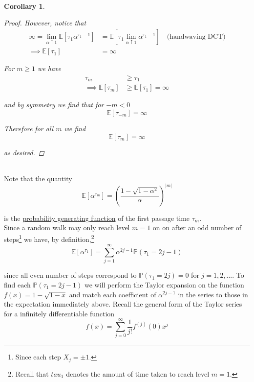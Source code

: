 \documentclass[12pt]{article}
\newtheorem{corollary}{Corollary}
\newlength\tindent
\renewcommand{\indent}{\hspace*{\tindent}}
\renewcommand{\P}{\mathbb P}
\newcommand{\E}{\mathbb E}
\begin{document}
\begin{corollary}
\begin{proof}
However, notice that
\begin{align*}
	\infty = \lim_{\alpha\uparrow 1} \E[\tau_1 \alpha^{\tau_1 - 1} ] &= \E \left[ \tau_1 \lim_{\alpha\uparrow 1} \alpha^{\tau_1 - 1} \right] \quad \text{(handwaving DCT)} \\
	\implies \E[\tau_1] &= \infty
\end{align*}

For $m \geq 1$ we have
\begin{align*}
	\tau_m &\geq \tau_1 \\
	\implies \E[\tau_m] &\geq \E[\tau_1] = \infty
\end{align*}

and by symmetry we find that for $-m < 0$
\begin{equation*}
	\E[\tau_{-m}] = \infty
\end{equation*}

Therefore for all $m$ we find
\begin{equation*}
	\E[\tau_m] = \infty
\end{equation*}

as desired.
\end{proof}
\end{corollary} \hfill\\

Note that the quantity
\begin{equation*}
	\E[\alpha^{\tau_m}] = \left(  \frac{ 1 - \sqrt{1 - \alpha^2} }{ \alpha } \right)^{|m|} 
\end{equation*}

is the \underline{probability generating function} of the first passage time $\tau_m$. \\

\indent Since a random walk may only reach level $m = 1$ on on after an odd number of steps\footnote{Since each step $X_j = \pm 1$.} we have, by definition,\footnote{Recall that $tau_1$ denotes the amount of time taken to reach level $m = 1$.}
\begin{equation*}
	\E[\alpha^{\tau_1}] = \sum^\infty_{j = 1} \alpha^{2j - 1} \P(\tau_1 = 2j - 1)
\end{equation*}

since all even number of steps correspond to $\P(\tau_1 = 2j) = 0$ for $j = 1,2,...$. To find each $\P(\tau_1 = 2j - 1)$ we will perform the Taylor expansion on the function $f(x) = 1 - \sqrt{1 - x}$ and match each coefficient of $\alpha^{2j - 1}$ in the series to those in the expectation immediately above. Recall the general form of the Taylor series for a infinitely differentiable function
\begin{equation*}
	f(x) = \sum^\infty_{j = 0} \frac{1}{j!} f^{(j)} (0) x^j
\end{equation*}
\end{document}
